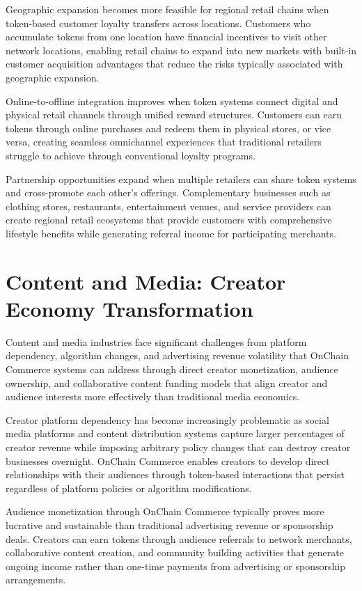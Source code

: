 \documentclass[
  Letterpaper,
]{scrbook}
\begin{document}
Geographic expansion becomes more feasible for regional retail chains
when token-based customer loyalty transfers across locations. Customers
who accumulate tokens from one location have financial incentives to
visit other network locations, enabling retail chains to expand into new
markets with built-in customer acquisition advantages that reduce the
risks typically associated with geographic expansion.

Online-to-offline integration improves when token systems connect
digital and physical retail channels through unified reward structures.
Customers can earn tokens through online purchases and redeem them in
physical stores, or vice versa, creating seamless omnichannel
experiences that traditional retailers struggle to achieve through
conventional loyalty programs.

Partnership opportunities expand when multiple retailers can share token
systems and cross-promote each other's offerings. Complementary
businesses such as clothing stores, restaurants, entertainment venues,
and service providers can create regional retail ecosystems that provide
customers with comprehensive lifestyle benefits while generating
referral income for participating merchants.

\section{Content and Media: Creator Economy
Transformation}\label{content-and-media-creator-economy-transformation}

Content and media industries face significant challenges from platform
dependency, algorithm changes, and advertising revenue volatility that
OnChain Commerce systems can address through direct creator
monetization, audience ownership, and collaborative content funding
models that align creator and audience interests more effectively than
traditional media economics.

Creator platform dependency has become increasingly problematic as
social media platforms and content distribution systems capture larger
percentages of creator revenue while imposing arbitrary policy changes
that can destroy creator businesses overnight. OnChain Commerce enables
creators to develop direct relationships with their audiences through
token-based interactions that persist regardless of platform policies or
algorithm modifications.

Audience monetization through OnChain Commerce typically proves more
lucrative and sustainable than traditional advertising revenue or
sponsorship deals. Creators can earn tokens through audience referrals
to network merchants, collaborative content creation, and community
building activities that generate ongoing income rather than one-time
payments from advertising or sponsorship arrangements.
\end{document}

